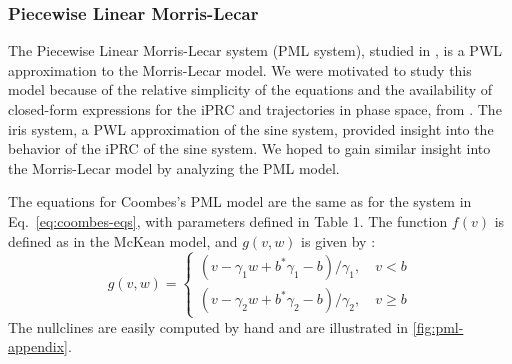 \documentclass[12pt]{article}
\begin{document}
\subsubsection{Piecewise Linear Morris-Lecar}\label{app:pml}
The Piecewise Linear Morris-Lecar system (PML system), studied in \cite{Coombes:2008:SIADS}, is a PWL approximation to the Morris-Lecar model.  We were motivated to study this model because of the relative simplicity of the equations and the availability of closed-form expressions for the iPRC and trajectories in phase space, from \cite{Coombes:2008:SIADS}.  The iris system, a PWL approximation of the sine system, provided insight into the behavior of the iPRC of the sine system.  We hoped to gain similar insight into the Morris-Lecar model by analyzing the PML model.

The equations for Coombes's PML model are the same as for the system in Eq.~\eqref{eq:coombes-eqs}, with parameters defined in Table 1.  The function $f(v)$ is defined as in the McKean model, and $g(v,w)$ is given by \cite{Coombes:2008:SIADS}:
 \begin{displaymath}
   g(v,w) = \left\{
     \begin{array}{lr}
       (v-\gamma_1w+b^*\gamma_1-b)/\gamma_1, \quad v < b\\
       (v-\gamma_2w+b^* \gamma_2-b)/\gamma_2, \quad v \geq b
     \end{array}
   \right.
\end{displaymath}
The nullclines are easily computed by hand and are illustrated in \ref{fig:pml-appendix}.
\end{document}
